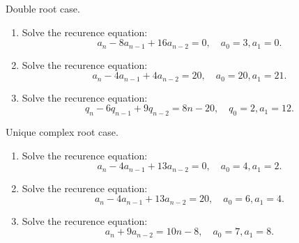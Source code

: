 \documentclass[12pt]{article}
\begin{document}
\begin{exercise}
Double root case. 
\begin{enumerate}[label=\alph*)]
    \item Solve the recurence equation:
    \[
    a_n - 8 a_{n-1} + 16 a_{n-2} = 0, \quad a_0 = 3, a_1 = 0.
    \]
    \item Solve the recurence equation:
    \[
    a_n - 4 a_{n-1} + 4 a_{n-2} = 20, \quad a_0 = 20, a_1 = 21.
    \]
    \item Solve the recurence equation:
    \[
    q_n - 6 q_{n-1} + 9q_{n-2} = 8n - 20, \quad q_0 = 2, a_1 = 12.
    \]
\end{enumerate}

\end{exercise}



\begin{exercise}
Unique complex root case. 
\begin{enumerate}[label=\alph*)]
    \item Solve the recurence equation:
    \[
    a_n - 4 a_{n-1} + 13 a_{n-2} = 0, \quad a_0 = 4, a_1 = 2.
    \]
    \item Solve the recurence equation:
    \[
    a_n - 4 a_{n-1} + 13 a_{n-2} = 20, \quad a_0 = 6, a_1 = 4.
    \]
    \item Solve the recurence equation:
    \[
    a_n + 9 a_{n-2} = 10n - 8, \quad a_0 = 7, a_1 = 8.
    \]
\end{enumerate}

\end{exercise}
\end{document}
